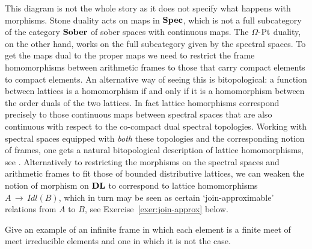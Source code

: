 \noindent This diagram is not the whole story as it does not specify what happens with morphisms. Stone duality acts on maps in $\mathbf{Spec}$, which is not a full subcategory of the category $\mathbf{Sober}$ of sober spaces with continuous maps. The $\Omega$-$\mathrm{Pt}$ duality, on the other hand, works on the full subcategory given by the spectral spaces. To get the maps dual to the proper maps we need to restrict the frame homomorphisms between arithmetic frames to those that carry compact elements to compact elements. An alternative way of seeing this is bitopological: a function between lattices is a homomorphism if and only if it is a homomorphism between the order duals of the two lattices. In fact lattice homorphisms correspond precisely to those continuous maps between spectral spaces that are also continuous with respect to the co-compact dual spectral topologies. Working with spectral spaces equipped with \emph{both} these topologies and the  corresponding notion of frames, one gets a natural bitopological description of lattice homomorphisms, see \cite{JuMo06}.
Alternatively to restricting the morphisms on the spectral spaces and arithmetic frames to fit those of bounded distributive lattices, we can weaken the notion of morphism on ${\mathbf{DL}}$ to correspond to lattice homomorphisms $A\,{\to}\, Idl(B)$, which in turn may be seen as certain `join-approximable' relations from $A$ to $B$, see Exercise~\ref{exer:join-approx} below.

\exercises



\begin{exercise}\label{exer:meet-irred}
Give an example of an infinite frame in which each element is a finite meet of meet irreducible elements and one in which it is not the case.
\end{exercise}

